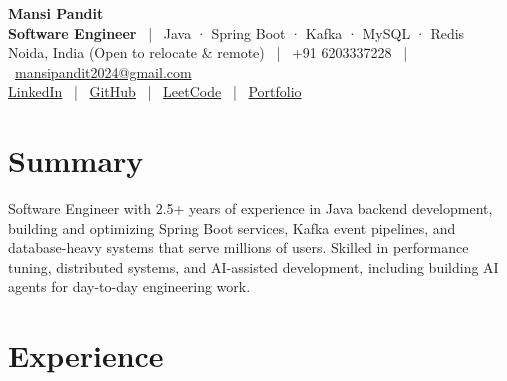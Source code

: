 \documentclass[10pt,a4paper]{article}
\begin{document}
\begin{center}
  {\fontsize{25}{28}\selectfont\bfseries\color{navy} Mansi Pandit}\\[2pt]
  {\large\bfseries Software Engineer} \ \textcolor{muted}{|} \ {\large Java · Spring Boot · Kafka · MySQL · Redis}\\[4pt]
  Noida, India (Open to relocate \& remote) \ | \ +91 6203337228 \ | \ \href{mailto:mansipandit2024@gmail.com}{mansipandit2024@gmail.com}\\[1pt]
  \href{https://linkedin.com/in/mansi2020}{LinkedIn} \ | \
  \href{https://github.com/mansi2024}{GitHub} \ | \
  \href{https://leetcode.com/procoder24}{LeetCode} \ | \
  \href{https://my-portfolio-lac-six-54.vercel.app/}{Portfolio}
\end{center}

\section*{Summary}
Software Engineer with 2.5+ years of experience in Java backend development, building and optimizing Spring Boot services, Kafka event pipelines, and database-heavy systems that serve millions of users. Skilled in performance tuning, distributed systems, and AI-assisted development, including building AI agents for day-to-day engineering work.

\section*{Experience}
\end{document}
